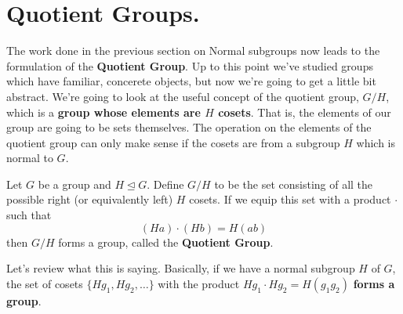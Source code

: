\documentclass[12pt,letterpaper]{algebra_book}
\newcommand{\normal}{\unlhd}
\theoremstyle{definition}
\begin{document}
    \section{Quotient Groups.}
    The work done in the previous section on Normal subgroups now
    leads to the formulation of the \textbf{Quotient Group}. Up to
    this point we've studied groups which have familiar, concerete
    objects, but now we're going to get a little bit abstract.
    We're going to look at the useful concept of the quotient group, $G/H$,
    which is a 
    \textbf{group whose elements are $H$ cosets}. That is, the elements of
    our group are going to be sets themselves. The operation on the
    elements of the quotient group can only make sense if the cosets
    are from a subgroup $H$ which is normal to $G$.

    \begin{thm}
        Let $G$ be a group and $H \normal G$. Define $G/H$ to be the
        set consisting of all the possible right (or equivalently
        left) $H$ cosets. If we
        equip this set with a product $\cdot$ such that 
        \[
            (Ha)\cdot(Hb) = H(ab)
        \]
        then $G/H$ forms a group, called the \textbf{Quotient Group}.
    \end{thm}
    Let's review what this is saying. Basically, if we have a normal
    subgroup $H$ of $G$, the set of cosets $\{Hg_1, Hg_2, \dots \}$
    with the product $Hg_1 \cdot Hg_2 = H(g_1g_2)$ \textbf{forms a group}.
\end{document}

